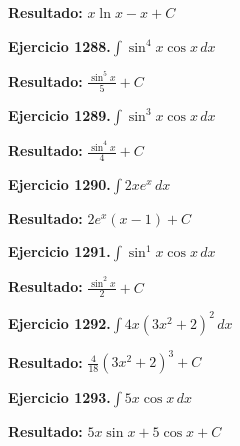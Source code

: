 \documentclass[10pt,a4paper]{article}
\begin{document}
\begin{solbox}
\textbf{Resultado:} \(\displaystyle x\ln x - x + C\)
\end{solbox}

\newpage
\begin{ejbox}
\textbf{Ejercicio 1288.}\quad $\int \sin^{4}x \cos x\,dx$
\end{ejbox}

\begin{solbox}
\textbf{Resultado:} \(\displaystyle \frac{\sin^{5}x}{5} + C\)
\end{solbox}

\begin{ejbox}
\textbf{Ejercicio 1289.}\quad $\int \sin^{3}x \cos x\,dx$
\end{ejbox}

\begin{solbox}
\textbf{Resultado:} \(\displaystyle \frac{\sin^{4}x}{4} + C\)
\end{solbox}

\begin{ejbox}
\textbf{Ejercicio 1290.}\quad $\int 2x e^{x}\,dx$
\end{ejbox}

\begin{solbox}
\textbf{Resultado:} \(\displaystyle 2e^x(x-1) + C\)
\end{solbox}

\newpage
\begin{ejbox}
\textbf{Ejercicio 1291.}\quad $\int \sin^{1}x \cos x\,dx$
\end{ejbox}

\begin{solbox}
\textbf{Resultado:} \(\displaystyle \frac{\sin^{2}x}{2} + C\)
\end{solbox}

\begin{ejbox}
\textbf{Ejercicio 1292.}\quad $\int 4x(3x^2 + 2)^{2}\,dx$
\end{ejbox}

\begin{solbox}
\textbf{Resultado:} \(\displaystyle \frac{4}{18}(3x^2+2)^{3} + C\)
\end{solbox}

\begin{ejbox}
\textbf{Ejercicio 1293.}\quad $\int 5x \cos x\,dx$
\end{ejbox}

\begin{solbox}
\textbf{Resultado:} \(\displaystyle 5x\sin x + 5\cos x + C\)
\end{solbox}
\end{document}
